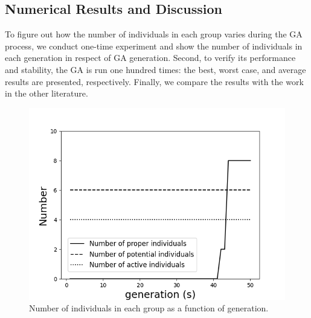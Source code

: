 \subsection{Numerical Results and Discussion}
To figure out how the number of individuals in each group varies during the GA
process, we conduct one-time experiment and show the number of individuals
in each generation in respect of GA generation. Second, to verify its
performance and stability, the GA is run one hundred times: the best, worst
case, and average results are presented, respectively. Finally, we compare
the results with the work in the other literature.

\begin{figure}[!tb]
	\centering
	\includegraphics[width=\linewidth]{Figures/chapter4/part1/fig/group_number.png}
	\caption{Number of individuals in each group as a function of generation.}
	\label{fig:group}
\end{figure}

